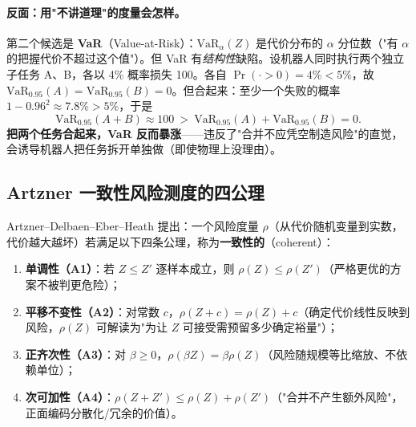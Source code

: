 \paragraph{反面：用"不讲道理"的度量会怎样。}
第二个候选是 \textbf{VaR}（Value-at-Risk）：$\mathrm{VaR}_\alpha(Z)$ 是代价分布的 $\alpha$ 分位数（"有 $\alpha$ 的把握代价不超过这个值"）。但 VaR 有\emph{结构性}缺陷。设机器人同时执行两个独立子任务 A、B，各以 4\% 概率损失 100。各自 $\Pr(\cdot>0)=4\%<5\%$，故 $\mathrm{VaR}_{0.95}(A)=\mathrm{VaR}_{0.95}(B)=0$。但合起来：至少一个失败的概率 $1-0.96^2\approx7.8\%>5\%$，于是
\begin{equation}
  \mathrm{VaR}_{0.95}(A+B)\approx100\ >\ \mathrm{VaR}_{0.95}(A)+\mathrm{VaR}_{0.95}(B)=0.
  \label{eq:risk-var-counter}
\end{equation}
\textbf{把两个任务合起来，VaR 反而暴涨}——违反了"合并不应凭空制造风险"的直觉，会诱导机器人把任务拆开单独做（即使物理上没理由）。

\subsection{Artzner 一致性风险测度的四公理}
\label{sec:risk-axioms}

\begin{definition}[一致性风险测度]\label{def:risk-coherent}
Artzner--Delbaen--Eber--Heath\cite{artzner1999coherent} 提出：一个风险度量 $\rho$（从代价随机变量到实数，代价越大越坏）若满足以下四条公理，称为\textbf{一致性的}（coherent）：
\begin{enumerate}
  \item \textbf{单调性（A1）}：若 $Z\le Z'$ 逐样本成立，则 $\rho(Z)\le\rho(Z')$（严格更优的方案不被判更危险）；
  \item \textbf{平移不变性（A2）}：对常数 $c$，$\rho(Z+c)=\rho(Z)+c$（确定代价线性反映到风险，$\rho(Z)$ 可解读为"为让 $Z$ 可接受需预留多少确定裕量"）；
  \item \textbf{正齐次性（A3）}：对 $\beta\ge0$，$\rho(\beta Z)=\beta\rho(Z)$（风险随规模等比缩放、不依赖单位）；
  \item \textbf{次可加性（A4）}：$\rho(Z+Z')\le\rho(Z)+\rho(Z')$（"合并不产生额外风险"，正面编码分散化/冗余的价值）。
\end{enumerate}
\end{definition}

